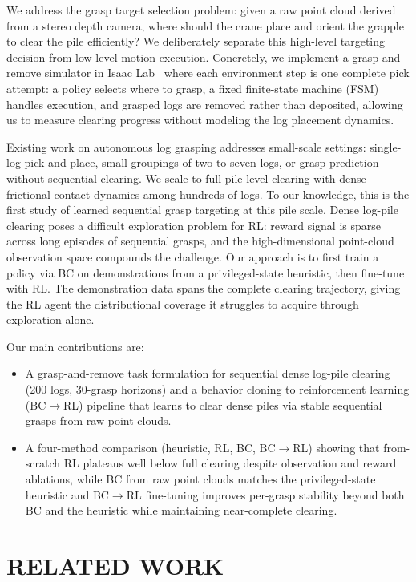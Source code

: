 \documentclass[letterpaper, 10 pt, conference]{ieeeconf}
\begin{document}
We address the grasp target selection problem: given a raw point cloud derived from a stereo depth camera, where should the crane place and orient the grapple to clear the pile efficiently?
We deliberately separate this high-level targeting decision from low-level motion execution.
Concretely, we implement a grasp-and-remove simulator in Isaac Lab~\cite{mittal2025isaaclab} where each environment step is one complete pick attempt: a policy selects where to grasp, a fixed finite-state machine (FSM) handles execution, and grasped logs are removed rather than deposited, allowing us to measure clearing progress without modeling the log placement dynamics.

Existing work on autonomous log grasping addresses small-scale settings: single-log pick-and-place, small groupings of two to seven logs, or grasp prediction without sequential clearing.
We scale to full pile-level clearing with dense frictional contact dynamics among hundreds of logs.
To our knowledge, this is the first study of learned sequential grasp targeting at this pile scale.
Dense log-pile clearing poses a difficult exploration problem for RL: reward signal is sparse across long episodes of sequential grasps, and the high-dimensional point-cloud observation space compounds the challenge.
Our approach is to first train a policy via BC on demonstrations from a privileged-state heuristic, then fine-tune with RL.
The demonstration data spans the complete clearing trajectory, giving the RL agent the distributional coverage it struggles to acquire through exploration alone.

Our main contributions are:
\begin{itemize}
    \item A grasp-and-remove task formulation for sequential dense log-pile clearing (200 logs, 30-grasp horizons) and a behavior cloning to reinforcement learning (BC$\to$RL) pipeline that learns to clear dense piles via stable sequential grasps from raw point clouds.
    \item A four-method comparison (heuristic, RL, BC, BC$\to$RL) showing that from-scratch RL plateaus well below full clearing despite observation and reward ablations, while BC from raw point clouds matches the privileged-state heuristic and BC$\to$RL fine-tuning improves per-grasp stability beyond both BC and the heuristic while maintaining near-complete clearing.
\end{itemize}

\section{RELATED WORK}
\end{document}
